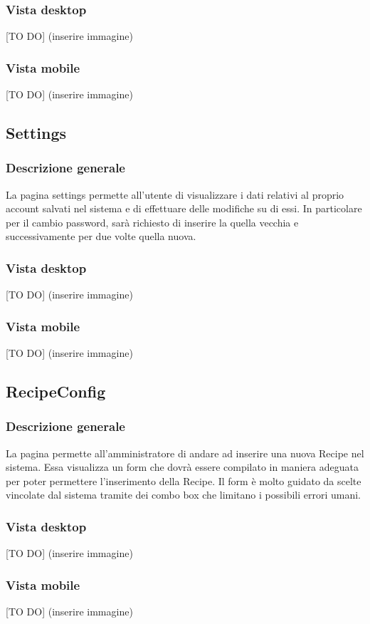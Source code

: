 		\subsubsection{Vista desktop} %
		[TO DO] (inserire immagine)

		\subsubsection{Vista mobile} %
		[TO DO] (inserire immagine)

	\subsection{Settings} %
	\label{sub:settings}
		\subsubsection{Descrizione generale} %
		La pagina settings permette all'utente di visualizzare i dati relativi al proprio account salvati nel sistema e di effettuare delle modifiche su di essi. In particolare per il cambio password, sarà richiesto di inserire la quella vecchia e successivamente per due volte quella nuova.

		\subsubsection{Vista desktop} %
		[TO DO] (inserire immagine)

		\subsubsection{Vista mobile} %
		[TO DO] (inserire immagine)

	\subsection{RecipeConfig} %
	\label{sub:recipeconfig}
		\subsubsection{Descrizione generale} %
		La pagina permette all'amministratore di andare ad inserire una nuova Recipe nel sistema. Essa visualizza un form che dovrà essere compilato in maniera adeguata per poter permettere l'inserimento della Recipe. Il form è molto guidato da scelte vincolate dal sistema tramite dei combo box che limitano i possibili errori umani. 

		\subsubsection{Vista desktop} %
		[TO DO] (inserire immagine)

		\subsubsection{Vista mobile} %
		[TO DO] (inserire immagine)


